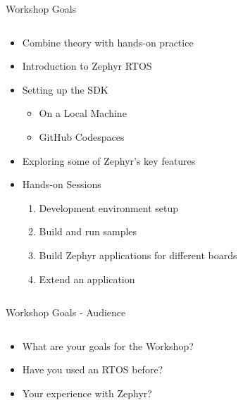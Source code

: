 \documentclass[10pt, aspectratio=169]{beamer}
\begin{document}
\begin{frame}[fragile]{Workshop Goals}
  \begin{columns}[]
    \begin{column}{0.6\textwidth}
      \begin{itemize}
        \item Combine theory with hands-on practice
        \item Introduction to Zephyr RTOS
        \item Setting up the SDK
          \begin{itemize}
            \item On a Local Machine
            \item GitHub Codespaces
          \end{itemize}
        \item Exploring some of Zephyr's key features
        \item Hands-on Sessions
          \begin{enumerate}
            \item Development environment setup
            \item Build and run samples
            \item Build Zephyr applications for different boards
            \item Extend an application
          \end{enumerate}
      \end{itemize}
    \end{column}
    \begin{column}{0.4\textwidth}
    \end{column}
  \end{columns}
\end{frame}
\begin{frame}[fragile]{Workshop Goals - Audience}
  \begin{columns}[]
    \begin{column}{0.6\textwidth}
      \begin{itemize}
        \item What are your goals for the Workshop?
        \item Have you used an RTOS before?
        \item Your experience with Zephyr?
      \end{itemize}
    \end{column}
    \begin{column}{0.4\textwidth}
    \end{column}
  \end{columns}
\end{frame}
\end{document}
